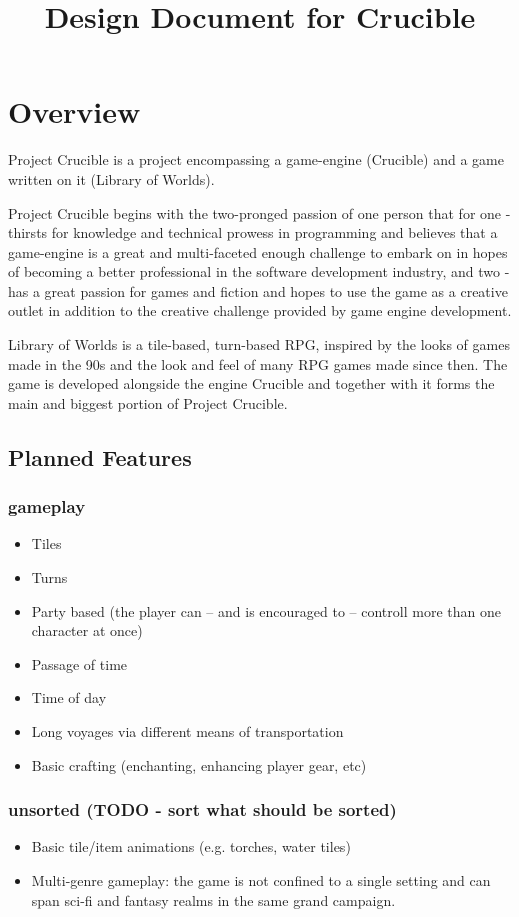 \documentclass[a4paper,10pt]{book}
\begin{document}
\title{Design Document for Crucible}
\tableofcontents

\newcommand{\Projectname}{Project Crucible}
\newcommand{\Enginename}{Crucible}
\newcommand{\Gamename}{Library of Worlds}

\chapter{Overview}
\Projectname{} is a project encompassing a game-engine (\Enginename{}) and a game written on it (\Gamename{}).

\Projectname{} begins with the two-pronged passion of one person that for one - thirsts for knowledge and technical prowess in programming and believes that a game-engine is a great and multi-faceted enough challenge to embark on in hopes of becoming a better professional in the software development industry, and two - has a great passion for games and fiction and hopes to use the game as a creative outlet in addition to the creative challenge provided by game engine development.

\Gamename{} is a tile-based, turn-based RPG, inspired by the looks of games made in the 90s and the look and feel of many RPG games made since then. The game is developed alongside the engine \Enginename{} and together with it forms the main and biggest portion of \Projectname{}.

\section{Planned Features}
\subsection{gameplay}
\begin{itemize}
  \item Tiles
  \item Turns
  \item Party based (the player can -- and is encouraged to -- controll more than one character at once)
  \item Passage of time
  \item Time of day
  \item Long voyages via different means of transportation
  \item Basic crafting (enchanting, enhancing player gear, etc)
\end{itemize}
\subsection{unsorted (TODO - sort what should be sorted)}
\begin{itemize}
  \item Basic tile/item animations (e.g. torches, water tiles)
  \item Multi-genre gameplay: the game is not confined to a single setting and can span sci-fi and fantasy realms in the same grand campaign.
\end{itemize}
\end{document}
